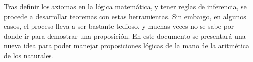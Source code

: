 
Tras definir los axiomas en la lógica matemática, y tener reglas de inferencia, se procede a desarrollar teoremas con estas herramientas. Sin embargo, en algunos casos, el proceso lleva a ser bastante tedioso, y muchas veces no se sabe por donde ir para demostrar una proposición. En este documento se presentará una nueva idea para poder manejar proposiciones lógicas de la mano de la aritmética de los naturales.

